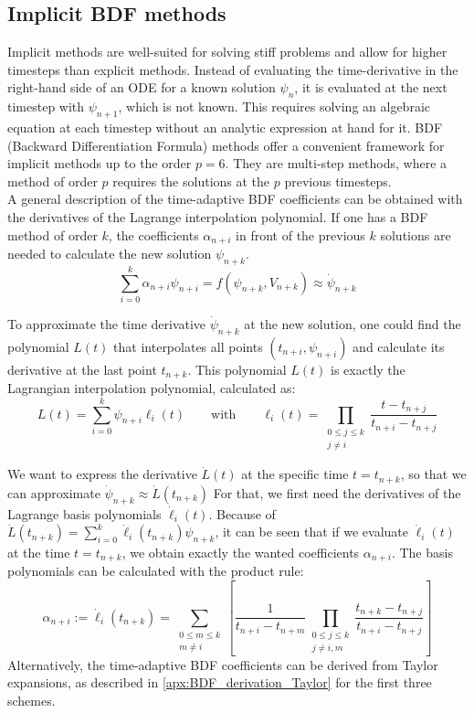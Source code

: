 \subsection{Implicit BDF methods}
Implicit methods are well-suited for solving stiff problems and allow for higher timesteps than explicit methods. Instead of evaluating the time-derivative in the right-hand side of an ODE for a known solution $\psi_n$, it is evaluated at the next timestep with $\psi_{n+1}$, which is not known. This requires solving an algebraic equation at each timestep without an analytic expression at hand for it. BDF (Backward Differentiation Formula) methods offer a convenient framework for implicit methods up to the order $p=6$. They are multi-step methods, where a method of order $p$ requires the solutions at the $p$ previous timesteps.  \\
A general description of the time-adaptive BDF coefficients can be obtained with the derivatives of the Lagrange interpolation polynomial. If one has a BDF method of order $k$, the coefficients $\alpha_{n+i}$ in front of the previous $k$ solutions are needed to calculate the new solution $\psi_{n+k}$.
\begin{equation}
	\sum_{i=0}^{k}\alpha_{n+i}\psi_{n+i} = f(\psi_{n+k},V_{n+k}) \approx \dot{\psi}_{n+k}
\end{equation} 

To approximate the time derivative $\dot{\psi}_{n+k}$ at the new solution, one could find the polynomial $L(t)$ that interpolates all points $(t_{n+i}, \psi_{n+i})$ and calculate its derivative at the last point $t_{n+k}$. This polynomial $L(t)$ is exactly the Lagrangian interpolation polynomial, calculated as:
\begin{equation}
	L(t) = \sum_{i=0}^{k}\psi_{n+i}\ell_i(t) \qquad\text{with}\qquad \ell_i(t) = \prod_{\substack{0\le j\le k \\j \ne i}}\frac{t-t_{n+j}}{t_{n+i}-t_{n+j}}
\end{equation}

We want to express the derivative $\dot{L}(t)$ at the specific time $t=t_{n+k}$, so that we can approximate $\dot{\psi}_{n+k} \approx \dot{L}(t_{n+k})$ For that, we first need the derivatives of the Lagrange basis polynomials $\dot{\ell}_i(t)$. Because of $\dot{L}(t_{n+k}) = \sum_{i=0}^{k}\dot{\ell}_i(t_{n+k})\psi_{n+k}$, it can be seen that if we evaluate $\dot{\ell}_i(t)$ at the time $t=t_{n+k}$, we obtain exactly the wanted coefficients $\alpha_{n+i}$. The basis polynomials can be calculated with the product rule:
\begin{equation}
	\alpha_{n+i} := \dot{\ell}_i(t_{n+k}) = \sum_{\substack{0\le m\le k \\m \ne i}}\left[\frac{1}{t_{n+i}-t_{n+m}}\prod_{\substack{0\le j\le k \\j \ne i,m}}\frac{t_{n+k}-t_{n+j}}{t_{n+i}-t_{n+j}}\right]
\end{equation}
Alternatively, the time-adaptive BDF coefficients can be derived from Taylor expansions, as described in \autoref{apx:BDF_derivation_Taylor} for the first three schemes.

